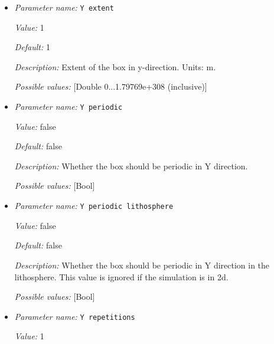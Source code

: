 \begin{itemize}
{\it Default:} 1


{\it Description:} Number of cells in X direction of the lower box. The same number of repetitions will be used in the upper box.


{\it Possible values:} [Integer range 1...2147483647 (inclusive)]
\item {\it Parameter name:} {\tt Y extent}
\label{parameters:Geometry model/Box with lithosphere boundary indicators/Y extent}


{\it Value:} 1


{\it Default:} 1


{\it Description:} Extent of the box in y-direction. Units: m.


{\it Possible values:} [Double 0...1.79769e+308 (inclusive)]
\item {\it Parameter name:} {\tt Y periodic}
\label{parameters:Geometry model/Box with lithosphere boundary indicators/Y periodic}


{\it Value:} false


{\it Default:} false


{\it Description:} Whether the box should be periodic in Y direction.


{\it Possible values:} [Bool]
\item {\it Parameter name:} {\tt Y periodic lithosphere}
\label{parameters:Geometry model/Box with lithosphere boundary indicators/Y periodic lithosphere}


{\it Value:} false


{\it Default:} false


{\it Description:} Whether the box should be periodic in Y direction in the lithosphere. This value is ignored if the simulation is in 2d. 


{\it Possible values:} [Bool]
\item {\it Parameter name:} {\tt Y repetitions}
\label{parameters:Geometry model/Box with lithosphere boundary indicators/Y repetitions}


{\it Value:} 1



\end{itemize}
